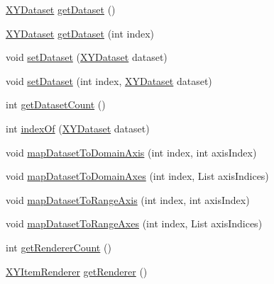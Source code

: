 \begin{DoxyCompactItemize}
\item 
\mbox{\hyperlink{interfaceorg_1_1jfree_1_1data_1_1xy_1_1_x_y_dataset}{X\+Y\+Dataset}} \mbox{\hyperlink{classorg_1_1jfree_1_1chart_1_1plot_1_1_x_y_plot_a109d6defa2ec268944bd4d15ed6129cc}{get\+Dataset}} ()
\item 
\mbox{\hyperlink{interfaceorg_1_1jfree_1_1data_1_1xy_1_1_x_y_dataset}{X\+Y\+Dataset}} \mbox{\hyperlink{classorg_1_1jfree_1_1chart_1_1plot_1_1_x_y_plot_ace9e15aa124f2cb7565d8a133c25ea77}{get\+Dataset}} (int index)
\item 
void \mbox{\hyperlink{classorg_1_1jfree_1_1chart_1_1plot_1_1_x_y_plot_ab26bacaaabe2637cdca239a6f3fff791}{set\+Dataset}} (\mbox{\hyperlink{interfaceorg_1_1jfree_1_1data_1_1xy_1_1_x_y_dataset}{X\+Y\+Dataset}} dataset)
\item 
void \mbox{\hyperlink{classorg_1_1jfree_1_1chart_1_1plot_1_1_x_y_plot_a7a36700f3f8bf8484c75f2f195e0daf2}{set\+Dataset}} (int index, \mbox{\hyperlink{interfaceorg_1_1jfree_1_1data_1_1xy_1_1_x_y_dataset}{X\+Y\+Dataset}} dataset)
\item 
int \mbox{\hyperlink{classorg_1_1jfree_1_1chart_1_1plot_1_1_x_y_plot_a68940382eb77b44df32658d540645a2c}{get\+Dataset\+Count}} ()
\item 
int \mbox{\hyperlink{classorg_1_1jfree_1_1chart_1_1plot_1_1_x_y_plot_a219772dc779c8d221503e65519070209}{index\+Of}} (\mbox{\hyperlink{interfaceorg_1_1jfree_1_1data_1_1xy_1_1_x_y_dataset}{X\+Y\+Dataset}} dataset)
\item 
void \mbox{\hyperlink{classorg_1_1jfree_1_1chart_1_1plot_1_1_x_y_plot_accf6de4266638c98821ec41ff0e90455}{map\+Dataset\+To\+Domain\+Axis}} (int index, int axis\+Index)
\item 
void \mbox{\hyperlink{classorg_1_1jfree_1_1chart_1_1plot_1_1_x_y_plot_a5ecd05c9688ef985aa6ce9727e6fe98a}{map\+Dataset\+To\+Domain\+Axes}} (int index, List axis\+Indices)
\item 
void \mbox{\hyperlink{classorg_1_1jfree_1_1chart_1_1plot_1_1_x_y_plot_a0f3db6eea8441891a6ece35ecded8dd5}{map\+Dataset\+To\+Range\+Axis}} (int index, int axis\+Index)
\item 
void \mbox{\hyperlink{classorg_1_1jfree_1_1chart_1_1plot_1_1_x_y_plot_a255d00eae9a02551006220da21a72929}{map\+Dataset\+To\+Range\+Axes}} (int index, List axis\+Indices)
\item 
int \mbox{\hyperlink{classorg_1_1jfree_1_1chart_1_1plot_1_1_x_y_plot_a0ced5baf50c48faf2b27a44e3d5f12e2}{get\+Renderer\+Count}} ()
\item 
\mbox{\hyperlink{interfaceorg_1_1jfree_1_1chart_1_1renderer_1_1xy_1_1_x_y_item_renderer}{X\+Y\+Item\+Renderer}} \mbox{\hyperlink{classorg_1_1jfree_1_1chart_1_1plot_1_1_x_y_plot_adc261f128f1d00b8f474abc90075bf5d}{get\+Renderer}} ()

\end{DoxyCompactItemize}

